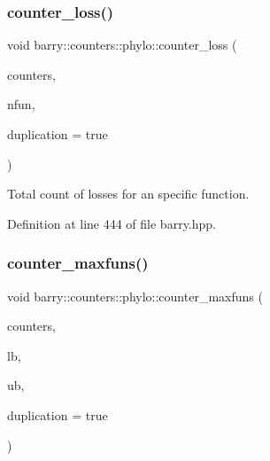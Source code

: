 \subsubsection{\texorpdfstring{counter\+\_\+loss()}{counter\_loss()}}
{\footnotesize\ttfamily void barry\+::counters\+::phylo\+::counter\+\_\+loss (\begin{DoxyParamCaption}\item[{\hyperlink{namespacebarry_1_1counters_1_1phylo_a4e401ffe66d04091343dcffaf915f8c3}{Phylo\+Counters} $\ast$}]{counters,  }\item[{std\+::vector$<$ \hyperlink{namespacebarry_a11dfc53ddb4672278319aa04f1e09a6c}{uint} $>$}]{nfun,  }\item[{bool}]{duplication = {\ttfamily true} }\end{DoxyParamCaption})\hspace{0.3cm}{\ttfamily [inline]}}



Total count of losses for an specific function. 



Definition at line 444 of file barry.\+hpp.

\mbox{\label{namespacebarry_1_1counters_1_1phylo_a80949b65fbe734d854742306065914bf}} 
\subsubsection{\texorpdfstring{counter\+\_\+maxfuns()}{counter\_maxfuns()}}
{\footnotesize\ttfamily void barry\+::counters\+::phylo\+::counter\+\_\+maxfuns (\begin{DoxyParamCaption}\item[{\hyperlink{namespacebarry_1_1counters_1_1phylo_a4e401ffe66d04091343dcffaf915f8c3}{Phylo\+Counters} $\ast$}]{counters,  }\item[{\hyperlink{namespacebarry_a11dfc53ddb4672278319aa04f1e09a6c}{uint}}]{lb,  }\item[{\hyperlink{namespacebarry_a11dfc53ddb4672278319aa04f1e09a6c}{uint}}]{ub,  }\item[{bool}]{duplication = {\ttfamily true} }\end{DoxyParamCaption})\hspace{0.3cm}{\ttfamily [inline]}}



